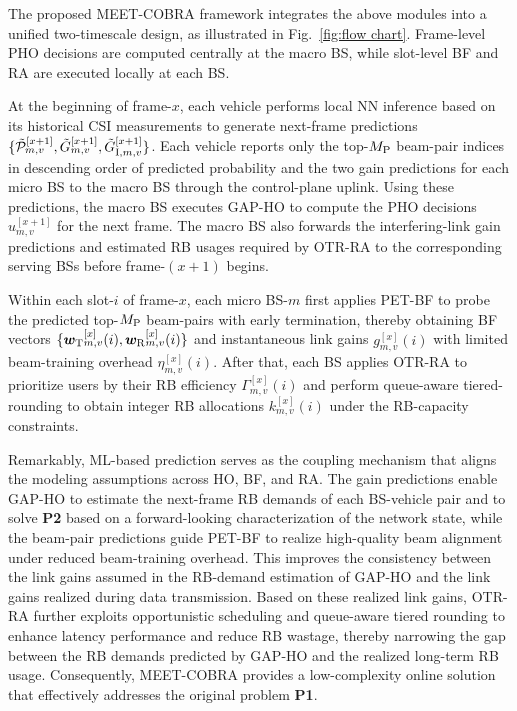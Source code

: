 \documentclass[10pt,journal,letterpaper]{IEEEtran}
\newcommand{\rev}[1]{\textcolor{revisioncolor}{{}#1}}
\newcommand{\omitted}[1]{}
\theoremstyle{remark}
\begin{document}

The proposed MEET-COBRA framework integrates the above modules into a unified two-timescale design, as illustrated in Fig.~\ref{fig:flow chart}.
Frame-level PHO decisions are computed centrally at the macro BS, while slot-level BF and RA are executed locally at each BS. 

At the beginning of frame-$x$, each vehicle performs local NN inference based on its historical CSI measurements to generate next-frame predictions $\{\Tilde{\mathcal{P}}_{m,v}^{[x+1]}, \Tilde{G}_{m,v}^{[x+1]}, \Tilde{G}_{{\rm I},m,v}^{[x+1]}\}$\omitted{}\rev{. Each vehicle reports only the top-$M_{\rm P}$ beam-pair indices in descending order of predicted probability and the two gain predictions for each micro BS to the macro BS through the control-plane uplink.} Using these predictions, the macro BS executes GAP-HO to compute the PHO decisions $u_{m,v}^{[x+1]}$ for the next frame. \rev{The macro BS also forwards the interfering-link gain predictions and estimated RB usages required by OTR-RA to the corresponding serving BSs before frame-$(x+1)$ begins.}

Within each slot-$i$ of frame-$x$, each micro BS-$m$ first applies PET-BF to probe the predicted top-$M_{\rm P}$ beam-pairs with early termination, thereby obtaining BF vectors $\{{\bm{w}_{\rm T}}_{m,v}^{[x]}(i), {\bm{w}_{\rm R}}_{m,v}^{[x]}(i)\}$ and instantaneous link gains $g_{m,v}^{[x]}(i)$ with limited beam-training overhead $\eta_{m,v}^{[x]}(i)$. 
After that, each BS applies OTR-RA to prioritize users by their RB efficiency $\Gamma_{m,v}^{[x]}(i)$ and perform queue-aware tiered-rounding to obtain integer RB allocations $k_{m,v}^{[x]}(i)$ under the RB-capacity constraints.

Remarkably, ML-based prediction serves as the coupling mechanism that aligns the modeling assumptions across HO, BF, and RA. The gain predictions enable GAP-HO to estimate the next-frame RB demands of each BS-vehicle pair and to solve \textbf{P2} based on a forward-looking characterization of the network state, while the beam-pair predictions guide PET-BF to realize high-quality beam alignment under reduced beam-training overhead. This improves the consistency between the link gains assumed in the RB-demand estimation of GAP-HO and the link gains realized during data transmission. Based on these realized link gains, OTR-RA further exploits opportunistic scheduling and queue-aware tiered rounding to enhance latency performance and reduce RB wastage, thereby narrowing the gap between the RB demands predicted by GAP-HO and the realized long-term RB usage. Consequently, MEET-COBRA provides a low-complexity online solution that effectively addresses the original problem \textbf{P1}.
\end{document}
